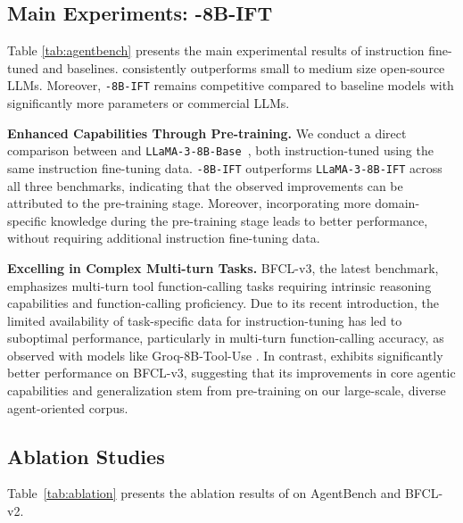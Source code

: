 \subsection{Main Experiments: \method-8B-IFT}
Table \ref{tab:agentbench} presents the main experimental results of instruction fine-tuned \method and baselines. 
\method consistently outperforms small to medium size open-source LLMs. Moreover, \texttt{\method-8B-IFT} remains competitive compared to baseline models with significantly more parameters or commercial LLMs. 

\noindent \textbf{Enhanced Capabilities Through Pre-training.}
We conduct a direct comparison between \method and \texttt{LLaMA-3-8B-Base}~\cite{dubey2024llama}, both instruction-tuned using the same instruction fine-tuning data. \texttt{\method-8B-IFT} outperforms \texttt{LLaMA-3-8B-IFT} across all three benchmarks, indicating that the observed improvements can be attributed to the pre-training stage. 
Moreover, incorporating more domain-specific knowledge during the pre-training stage leads to better performance, without requiring additional instruction fine-tuning data.

\noindent \textbf{Excelling in Complex Multi-turn Tasks.}
BFCL-v3, the latest benchmark, emphasizes multi-turn tool function-calling tasks requiring intrinsic reasoning capabilities and function-calling proficiency. 
Due to its recent introduction, the limited availability of task-specific data for instruction-tuning has led to suboptimal performance, particularly in multi-turn function-calling accuracy, as observed with models like Groq-8B-Tool-Use \cite{groq}. 
In contrast, \method exhibits significantly better performance on BFCL-v3, suggesting that its improvements in core agentic capabilities and generalization stem from pre-training on our large-scale, diverse agent-oriented corpus.




\subsection{Ablation Studies}
Table~\ref{tab:ablation} presents the ablation results of \method on AgentBench and BFCL-v2. 

